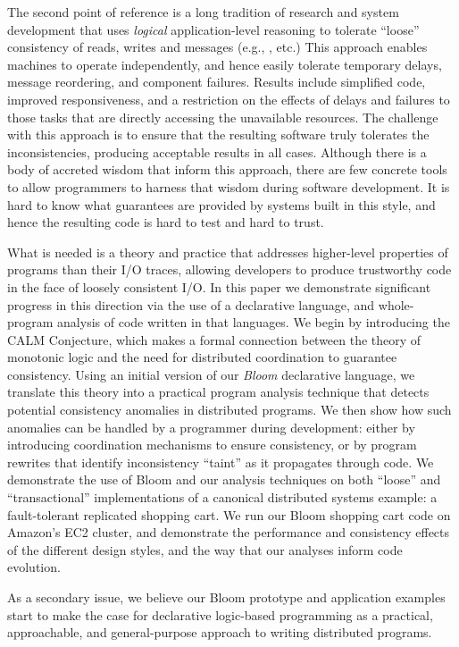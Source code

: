 The second point of reference is a long tradition of research and system development that uses {\em logical} application-level reasoning to tolerate ``loose'' consistency of reads, writes and messages (e.g., \cite{sagas,base,acid20}, etc.)  This approach enables machines to operate independently, and hence easily tolerate temporary delays, message reordering, and component failures.  Results include simplified code, improved responsiveness, and a restriction on the effects of delays and failures to those tasks that are directly accessing the unavailable resources.  The challenge with this approach is to ensure that the resulting software truly tolerates the inconsistencies, producing acceptable results in all cases.  Although there is a body of accreted wisdom that inform this approach, there are few concrete tools to allow programmers to harness that wisdom during software development.  It is hard to know what guarantees are provided by systems built in this style, and hence the resulting code is hard to test and hard to trust.  

What is needed is a theory and practice that addresses higher-level properties of programs than their I/O traces, allowing developers to produce trustworthy code in the face of loosely consistent I/O.  In this paper we demonstrate significant progress in this direction via the use of a declarative language, and whole-program analysis of code written in that languages.  We begin by introducing the CALM Conjecture, which makes a formal connection between the theory of monotonic logic and the need for distributed coordination to guarantee consistency.  Using an initial version of our {\em Bloom} declarative language, we translate this theory into a practical program analysis technique that detects potential consistency anomalies in distributed programs.  We then show how such anomalies can be handled by a programmer during development: either by introducing coordination mechanisms to ensure consistency, or by program rewrites that identify inconsistency ``taint'' as it propagates through code.  We demonstrate the use of Bloom and our analysis techniques on both ``loose'' and ``transactional'' implementations of a canonical distributed systems example: a fault-tolerant replicated shopping cart.  We run our Bloom shopping cart code on Amazon's EC2 cluster, and demonstrate the performance and consistency effects of the different design styles, and the way that our analyses inform code evolution.

As a secondary issue, we believe our Bloom prototype and application examples start to make the case for declarative logic-based programming as a practical, approachable, and general-purpose approach to writing distributed programs.
